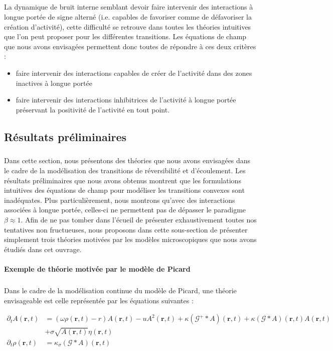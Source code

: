 \subparagraph{}La dynamique de bruit interne semblant devoir faire intervenir des interactions à longue portée de signe alterné (i.e. capables de favoriser comme de défavoriser la création d'activité), cette difficulté se retrouve dans toutes les théories intuitives que l'on peut proposer pour les différentes transitions. Les équations de champ que nous avons envisagées permettent donc toutes de répondre à ces deux critères :

\begin{itemize}
	\item faire intervenir des interactions capables de créer de l'activité dans des zones inactives à longue portée
	\item faire intervenir des interactions inhibitrices de l'activité à longue portée préservant la positivité de l'activité en tout point.
\end{itemize}

\subsection{Résultats préliminaires}

\subparagraph{}Dans cette section, nous présentons des théories que nous avons envisagées dans le cadre de la modélisation des transitions de réversibilité et d'écoulement. Les résultats préliminaires que nous avons obtenus montrent que les formulations intuitives des équations de champ pour modéliser les transitions convexes sont inadéquates. Plus particulièrement, nous montrons qu'avec des interactions associées à longue portée, celles-ci ne permettent pas de dépasser le paradigme $\beta \approx 1$. Afin de ne pas tomber dans l'écueil de présenter exhaustivement toutes nos tentatives non fructueuses, nous proposons dans cette sous-section de présenter simplement trois théories motivées par les modèles microscopiques que nous avons étudiés dans cet ouvrage.

\paragraph{Exemple de théorie motivée par le modèle de Picard}

\subparagraph{}Dans le cadre de la modélisation continue du modèle de Picard, une théorie envisageable est celle représentée par les équations suivantes :

\begin{equation}
    \begin{aligned}
        \partial_t A (\mathbf{r}, t) &= \left(\omega \rho (\mathbf{r}, t)-r\right) A (\mathbf{r}, t) - uA^2 (\mathbf{r}, t) + \kappa \left(\mathcal{G}^+\ast A \right)(\mathbf{r}, t) + \kappa\left(\mathcal{G}\ast A \right)(\mathbf{r}, t)A (\mathbf{r}, t) \\
        &+\sigma \sqrt{A (\mathbf{r}, t)}\eta(\mathbf{r}, t)\\
        \partial_t \rho (\mathbf{r}, t) &= \kappa_\sigma \left(\mathcal{G}\ast A \right)(\mathbf{r}, t)
    \end{aligned}
\label{eq:YieldingD}
\end{equation}

